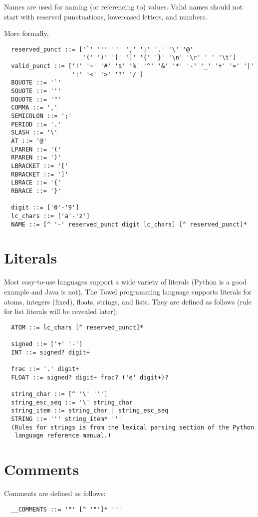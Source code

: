 \documentclass{book}
\begin{document}
Names are used for naming (or referencing to) values. Valid names should not start with reserved punctuations, lowercased letters, and numbers.

More formally,
\begin{verbatim}
  reserved_punct ::= ['`' ''' '"' ',' ';' '.' '\' '@' 
                      '(' ')' '[' ']' '{' '}' '\n' '\r' ' ' '\t']
  valid_punct ::= ['!' '~' '#' '$' '%' '^' '&' '*' '-' '_' '+' '=' '|'
                   ':' '<' '>' '?' '/']
  BQUOTE ::= '`'
  SQUOTE ::= '''
  DQUOTE ::= '"'
  COMMA ::= ','
  SEMICOLON ::= ';'
  PERIOD ::= '.'
  SLASH ::= '\'
  AT ::= '@'
  LPAREN ::= '('
  RPAREN ::= ')'
  LBRACKET ::= '['
  RBRACKET ::= ']'
  LBRACE ::= '{'
  RBRACE ::= '}'

  digit ::= ['0'-'9']
  lc_chars ::= ['a'-'z']
  NAME ::= [^ '-' reserved_punct digit lc_chars] [^ reserved_punct]*
\end{verbatim}

\section{Literals}

Most easy-to-use languages support a wide variety of literals (Python is a good example and Java is not). The Towel programming language supports literals for atoms, integers (fixed), floats, strings, and lists. They are defined as follows (rule for list literals will be revealed later):
\begin{verbatim}
  ATOM ::= lc_chars [^ reserved_punct]*

  signed ::= ['+' '-']
  INT ::= signed? digit+

  frac ::= '.' digit+
  FLOAT ::= signed? digit+ frac? ('e' digit+)?

  string_char ::= [^ '\' ''']
  string_esc_seq ::= '\' string_char
  string_item ::= string_char | string_esc_seq
  STRING ::= ''' string_item* '''
  (Rules for strings is from the lexical parsing section of the Python
   language reference manual.)
\end{verbatim}

\section{Comments}

Comments are defined as follows:
\begin{verbatim}
  __COMMENTS ::= '"' [^ '"']* '"'
\end{verbatim}
\end{document}
